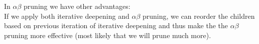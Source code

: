 \documentclass[12pt]{article}
\begin{document}
In $\alpha\beta$ pruning we have other advantages:\\


If we apply both iterative deepening and $\alpha\beta$ pruning, we can reorder the children based on previous iteration of iterative deepening and thus make the the $\alpha\beta$ pruning more effective (most likely that we will prune much more).

\begin{comment}
 
\end{comment}
\end{document}
